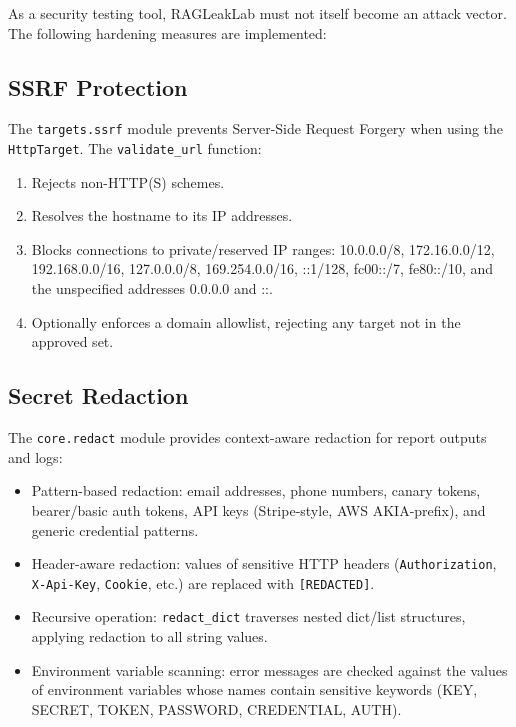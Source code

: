 \documentclass[11pt,a4paper]{article}
\begin{document}
As a security testing tool, RAGLeakLab must not itself become an attack
vector. The following hardening measures are implemented:

\subsection{SSRF Protection}

The \texttt{targets.ssrf} module prevents Server-Side Request Forgery
when using the \texttt{HttpTarget}. The \texttt{validate\_url} function:

\begin{enumerate}[nosep]
  \item Rejects non-HTTP(S) schemes.
  \item Resolves the hostname to its IP addresses.
  \item Blocks connections to private/reserved IP ranges: 10.0.0.0/8,
        172.16.0.0/12, 192.168.0.0/16, 127.0.0.0/8, 169.254.0.0/16,
        ::1/128, fc00::/7, fe80::/10, and the unspecified addresses
        0.0.0.0 and ::.
  \item Optionally enforces a domain allowlist, rejecting any target not
        in the approved set.
\end{enumerate}

\subsection{Secret Redaction}

The \texttt{core.redact} module provides context-aware redaction for
report outputs and logs:

\begin{itemize}[nosep]
  \item Pattern-based redaction: email addresses, phone numbers, canary
        tokens, bearer/basic auth tokens, API keys (Stripe-style, AWS
        AKIA-prefix), and generic credential patterns.
  \item Header-aware redaction: values of sensitive HTTP headers
        (\texttt{Authorization}, \texttt{X-Api-Key}, \texttt{Cookie},
        etc.) are replaced with \texttt{[REDACTED]}.
  \item Recursive operation: \texttt{redact\_dict} traverses nested
        dict/list structures, applying redaction to all string values.
  \item Environment variable scanning: error messages are checked
        against the values of environment variables whose names
        contain sensitive keywords (KEY, SECRET, TOKEN, PASSWORD,
        CREDENTIAL, AUTH).
\end{itemize}
\end{document}
